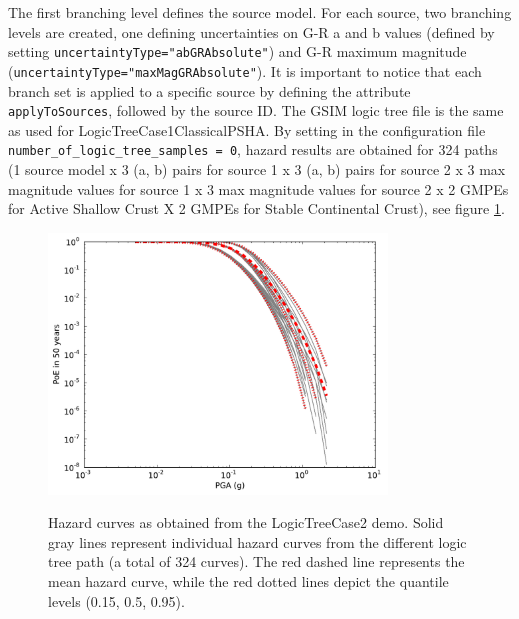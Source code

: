 The first branching level defines the source model. For each source, 
two branching levels are created, one defining
uncertainties on G-R a and b values (defined by setting 
\texttt{uncertaintyType="abGRAbsolute"}) and G-R maximum
magnitude (\texttt{uncertaintyType="maxMagGRAbsolute"}). 
%
It is important to notice that each branch set is applied
to a specific source by defining the attribute \texttt{apply\-To\-Sources}, 
followed by the source ID. The GSIM logic tree file is
the same as used for LogicTreeCase1ClassicalPSHA. By setting in the 
configuration file \texttt{number\_\-of\_\-logic\_\-tree\_\-samples = 0},
hazard results are obtained for 324 paths (1 source model x 3 (a, b) 
pairs for source 1 x  3 (a, b) pairs for source 2 x 3 max magnitude values
for source 1 x 3 max magnitude values for source 2 x 2 GMPEs for Active 
Shallow Crust X 2 GMPEs for Stable Continental Crust), see
figure \ref{fig:hazard_curves}.\\

\begin{figure}
\centering
\subcaptionbox{}
{\includegraphics[width=9cm]{figures/hazard/hazard-curves-ltcase2.pdf}} 
\caption{Hazard curves as obtained from the LogicTreeCase2 demo. Solid gray 
    lines represent individual hazard curves from the different
    logic tree path (a total of 324 curves). The red dashed line represents the
    mean hazard curve, while the red dotted lines depict the quantile levels
    (0.15, 0.5, 0.95).}
\label{fig:hazard_curves}
\end{figure}

